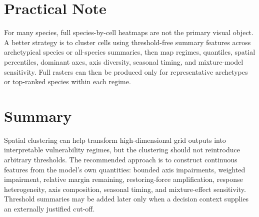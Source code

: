 \documentclass[11pt]{article}
\begin{document}
\section{Practical Note}
For many species, full species-by-cell heatmaps are not the primary visual object. A better strategy is to
cluster cells using threshold-free summary features across archetypical species or all-species summaries,
then map regimes, quantiles, spatial percentiles, dominant axes, axis diversity, seasonal timing, and
mixture-model sensitivity. Full rasters can then be produced only for representative archetypes or top-ranked
species within each regime.

\section{Summary}
Spatial clustering can help transform high-dimensional grid outputs into interpretable vulnerability regimes,
but the clustering should not reintroduce arbitrary thresholds. The recommended approach is to construct
continuous features from the model's own quantities: bounded axis impairments, weighted impairment,
relative margin remaining, restoring-force amplification, response heterogeneity, axis composition, seasonal
timing, and mixture-effect sensitivity. Threshold summaries may be added later only when a decision context
supplies an externally justified cut-off.
\end{document}

